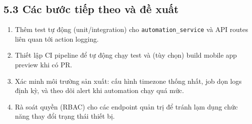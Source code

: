\documentclass[12pt]{article}
\begin{document}
\subsection{5.3 Các bước tiếp theo và đề xuất}
\begin{enumerate}[noitemsep]
  \item Thêm test tự động (unit/integration) cho \texttt{automation\_service} và API routes liên quan tới action logging.
  \item Thiết lập CI pipeline để tự động chạy test và (tùy chọn) build mobile app preview khi có PR.
  \item Xác minh môi trường sản xuất: cấu hình timezone thống nhất, job dọn logs định kỳ, và theo dõi alert khi automation chạy quá mức.
  \item Rà soát quyền (RBAC) cho các endpoint quản trị để tránh lạm dụng chức năng thay đổi trạng thái thiết bị.
\end{enumerate}
\end{document}
